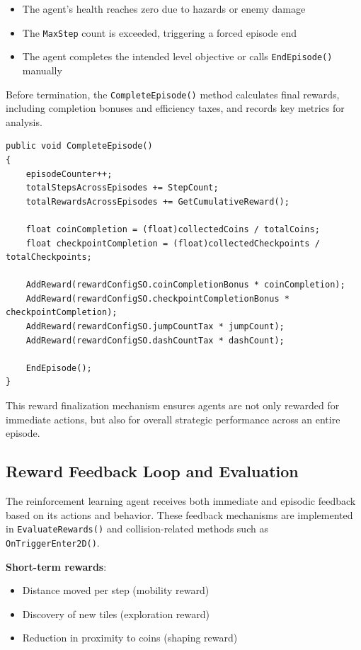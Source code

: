 \documentclass[12pt,oneside,openright,a4paper]{cpe-english-project}
\begin{document}
\begin{itemize}
\item The agent’s health reaches zero due to hazards or enemy damage
\item The \texttt{MaxStep} count is exceeded, triggering a forced episode end
\item The agent completes the intended level objective or calls \texttt{EndEpisode()} manually
\end{itemize}

Before termination, the \texttt{CompleteEpisode()} method calculates final rewards, including completion bonuses and efficiency taxes, and records key metrics for analysis.

\begin{lstlisting}[language={[Sharp]C}]
public void CompleteEpisode()
{
	episodeCounter++;
	totalStepsAcrossEpisodes += StepCount;
	totalRewardsAcrossEpisodes += GetCumulativeReward();
	
	float coinCompletion = (float)collectedCoins / totalCoins;
	float checkpointCompletion = (float)collectedCheckpoints / totalCheckpoints;

	AddReward(rewardConfigSO.coinCompletionBonus * coinCompletion);
	AddReward(rewardConfigSO.checkpointCompletionBonus * checkpointCompletion);
	AddReward(rewardConfigSO.jumpCountTax * jumpCount);
	AddReward(rewardConfigSO.dashCountTax * dashCount);

	EndEpisode();
}
\end{lstlisting}

This reward finalization mechanism ensures agents are not only rewarded for immediate actions, but also for overall strategic performance across an entire episode.

\subsection{Reward Feedback Loop and Evaluation}

The reinforcement learning agent receives both immediate and episodic feedback based on its actions and behavior. These feedback mechanisms are implemented in \texttt{EvaluateRewards()} and collision-related methods such as \texttt{OnTriggerEnter2D()}.

\textbf{Short-term rewards}:
\begin{itemize}
\item Distance moved per step (mobility reward)
\item Discovery of new tiles (exploration reward)
\item Reduction in proximity to coins (shaping reward)
\end{itemize}
\end{document}
